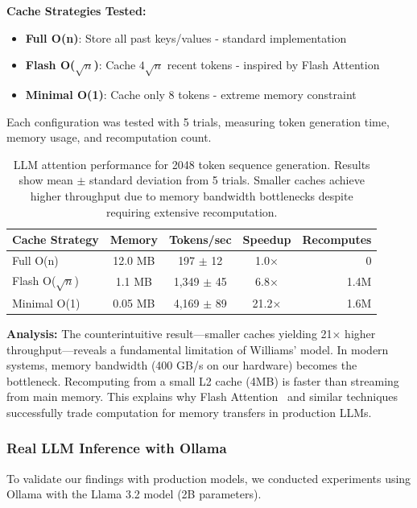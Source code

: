 \documentclass[11pt]{article}
\theoremstyle{definition}
\begin{document}
\textbf{Cache Strategies Tested:}
\begin{itemize}
\item \textbf{Full O(n)}: Store all past keys/values - standard implementation
\item \textbf{Flash O($\sqrt{n}$)}: Cache $4\sqrt{n}$ recent tokens - inspired by Flash Attention~\cite{flashattention2022}
\item \textbf{Minimal O(1)}: Cache only 8 tokens - extreme memory constraint
\end{itemize}

Each configuration was tested with 5 trials, measuring token generation time, memory usage, and recomputation count.

\begin{table}[ht]
\centering
\begin{tabular}{lcccr}
\toprule
Cache Strategy & Memory & Tokens/sec & Speedup & Recomputes \\
\midrule
Full O(n) & 12.0 MB & 197 $\pm$ 12 & 1.0× & 0 \\
Flash O($\sqrt{n}$) & 1.1 MB & 1,349 $\pm$ 45 & 6.8× & 1.4M \\
Minimal O(1) & 0.05 MB & 4,169 $\pm$ 89 & 21.2× & 1.6M \\
\bottomrule
\end{tabular}
\caption{LLM attention performance for 2048 token sequence generation. Results show mean $\pm$ standard deviation from 5 trials. Smaller caches achieve higher throughput due to memory bandwidth bottlenecks despite requiring extensive recomputation.}
\label{tab:llm}
\end{table}

\textbf{Analysis:} The counterintuitive result—smaller caches yielding 21× higher throughput—reveals a fundamental limitation of Williams' model. In modern systems, memory bandwidth (400 GB/s on our hardware) becomes the bottleneck. Recomputing from a small L2 cache (4MB) is faster than streaming from main memory. This explains why Flash Attention~\cite{flashattention2022} and similar techniques successfully trade computation for memory transfers in production LLMs.

\subsubsection{Real LLM Inference with Ollama}

To validate our findings with production models, we conducted experiments using Ollama with the Llama 3.2 model (2B parameters).
\end{document}
